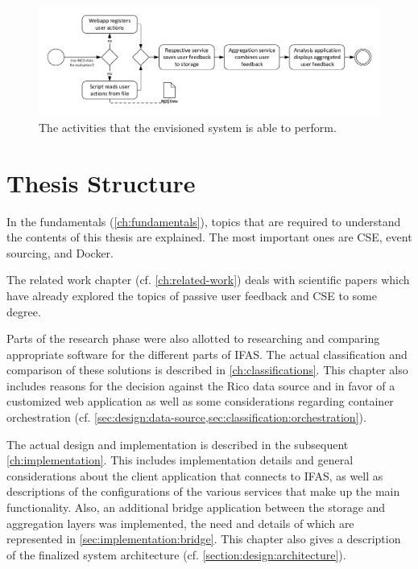 \begin{figure}[ht]
        \includegraphics[width=1.1\textwidth]{gfx/architecture-3.pdf}
        \caption{The activities that the envisioned system is able to perform.}
        \label{fig:system:vision}
\end{figure}


\section{Thesis Structure}
\label{sec:intro:structure}

In the fundamentals (\cref{ch:fundamentals}), topics that are required to understand the contents of this thesis are explained.
The most important ones are \acf{CSE}, event sourcing, and Docker.

The related work chapter (cf. \cref{ch:related-work}) deals with scientific papers which have already explored the topics of passive user feedback and \ac{CSE} to some degree.

Parts of the research phase were also allotted to researching and comparing appropriate software for the different parts of \ac{IFAS}.
The actual classification and comparison of these solutions is described in \cref{ch:classifications}.
This chapter also includes reasons for the decision against the Rico data source and in favor of a customized web application as well as some considerations regarding container orchestration (cf. \cref{sec:design:data-source,sec:classification:orchestration}).

The actual design and implementation is described in the subsequent \cref{ch:implementation}.
This includes implementation details and general considerations about the client application that connects to \ac{IFAS}, as well as descriptions of the configurations of the various services that make up the main functionality.
Also, an additional bridge application between the storage and aggregation layers was implemented, the need and details of which are represented in \cref{sec:implementation:bridge}.
This chapter also gives a description of the finalized system architecture (cf. \cref{section:design:architecture}).

